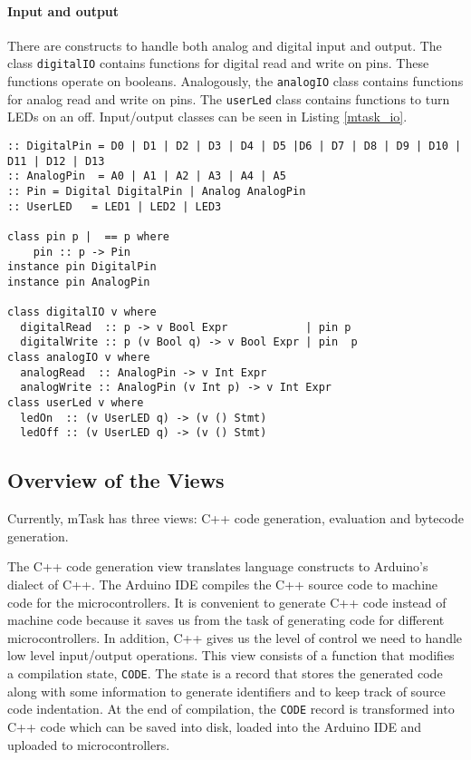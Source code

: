 \paragraph{Input and output} There are constructs to handle both analog and digital input and output. The class \texttt{digitalIO} contains
functions for digital read and write on pins. These functions operate on booleans. Analogously, the \texttt{analogIO} class contains functions for analog read and write on pins. The \texttt{userLed} class contains functions to turn LEDs on an off. Input/output classes can be seen in Listing \ref{mtask_io}. 

\begin{lstlisting}[caption=mTask I/O classes,captionpos=b,label=mtask_io]
:: DigitalPin = D0 | D1 | D2 | D3 | D4 | D5 |D6 | D7 | D8 | D9 | D10 | D11 | D12 | D13
:: AnalogPin  = A0 | A1 | A2 | A3 | A4 | A5
:: Pin = Digital DigitalPin | Analog AnalogPin
:: UserLED   = LED1 | LED2 | LED3

class pin p |  == p where
	pin :: p -> Pin
instance pin DigitalPin
instance pin AnalogPin

class digitalIO v where
  digitalRead  :: p -> v Bool Expr            | pin p
  digitalWrite :: p (v Bool q) -> v Bool Expr | pin  p
class analogIO v where
  analogRead  :: AnalogPin -> v Int Expr 
  analogWrite :: AnalogPin (v Int p) -> v Int Expr
class userLed v where
  ledOn  :: (v UserLED q) -> (v () Stmt)
  ledOff :: (v UserLED q) -> (v () Stmt)
\end{lstlisting}


\subsection{Overview of the Views}\label{sec:mtask_views}

Currently, mTask has three views: C++ code generation, evaluation and bytecode generation.

The C++ code generation view translates language constructs to Arduino's dialect of C++. The Arduino IDE compiles the C++ source code to machine code for the microcontrollers. 
It is convenient to generate C++ code instead of machine code because it saves us from the task of generating code for different microcontrollers. In addition, C++ gives us the level of control we need to handle low level input/output operations. This view consists of a function that modifies a compilation state, \texttt{CODE}. The state is a record that stores the generated code along with some information to generate identifiers and to keep track of source code indentation. At the end of compilation, the \texttt{CODE} record is transformed into C++ code which can be saved into disk, loaded into the Arduino IDE and uploaded to microcontrollers.


